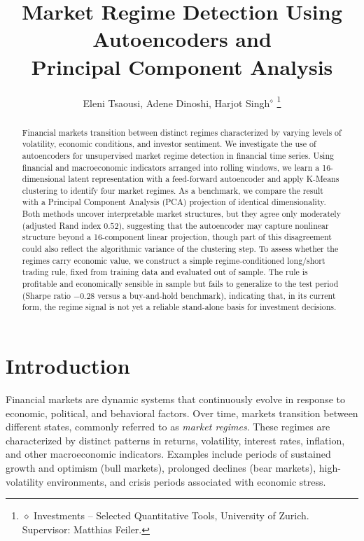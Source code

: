 \documentclass[conference]{IEEEtran}
\begin{document}
\title{Market Regime Detection Using Autoencoders and\\ Principal Component Analysis}
\author{Eleni Tsaousi, Adene Dinoshi, Harjot Singh$^{\diamond}$
\thanks{$\diamond$ Investments -- Selected Quantitative Tools, University of Zurich. Supervisor: Matthias Feiler.}}
\maketitle

\begin{abstract}
Financial markets transition between distinct regimes characterized by varying
levels of volatility, economic conditions, and investor sentiment. We
investigate the use of autoencoders for unsupervised market regime detection in
financial time series. Using financial and macroeconomic indicators arranged
into rolling windows, we learn a 16-dimensional latent representation with a
feed-forward autoencoder and apply K-Means clustering to identify four market
regimes. As a benchmark, we compare the result with a Principal Component
Analysis (PCA) projection of identical dimensionality. Both methods uncover
interpretable market structures, but they agree only moderately (adjusted Rand
index $0.52$), suggesting that the autoencoder may capture nonlinear structure
beyond a 16-component linear projection, though part of this disagreement could
also reflect the algorithmic variance of the clustering step. To assess whether the regimes
carry economic value, we construct a simple regime-conditioned long/short
trading rule, fixed from training data and evaluated out of sample. The rule is
profitable and economically sensible in sample but fails to generalize to the
test period (Sharpe ratio $-0.28$ versus a buy-and-hold benchmark), indicating
that, in its current form, the regime signal is not yet a reliable
stand-alone basis for investment decisions.
\end{abstract}

\section{Introduction}

Financial markets are dynamic systems that continuously evolve in response to
economic, political, and behavioral factors. Over time, markets transition
between different states, commonly referred to as \textit{market regimes}. These
regimes are characterized by distinct patterns in returns, volatility, interest
rates, inflation, and other macroeconomic indicators. Examples include periods
of sustained growth and optimism (bull markets), prolonged declines (bear
markets), high-volatility environments, and crisis periods associated with
economic stress.
\end{document}
